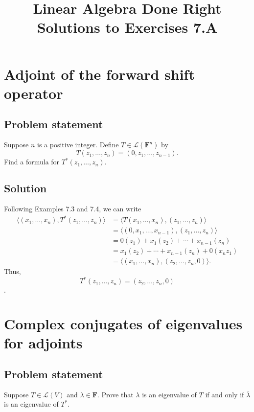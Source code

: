 \documentclass{article}
\title{Linear Algebra Done Right\\Solutions to Exercises 7.A}
\author{}
\date{}
\begin{document}
\maketitle

\section{Adjoint of the forward shift operator}
\subsection*{Problem statement}
Suppose $n$ is a positive integer. Define $T\in\mathcal{L}(\mathbf{F}^{n})$ by
\[T(z_1,\ldots,z_n)=(0,z_1,\ldots,z_{n-1}).\]
Find a formula for $T^*(z_1,\ldots,z_n)$.

\subsection*{Solution}
Following Examples 7.3 and 7.4, we can write
\begin{align*} 
\langle(x_1,\ldots,x_n),T^*(z_1,\ldots,z_n)\rangle &= \langle T(x_1,\ldots,x_n),(z_1,\ldots,z_n)\rangle \\ 
 &= \langle (0,x_1,\ldots,x_{n-1}),(z_1,\ldots,z_n)\rangle \\
 &= 0(z_1) + x_1(z_2) + \cdots + x_{n-1}(z_n) \\
 &= x_1(z_2) + \cdots + x_{n-1}(z_n) + 0(x_nz_1) \\
 &= \langle (x_1,\ldots,x_n),(z_2,\ldots,z_n,0)\rangle.
\end{align*}
Thus,
\[T^*(z_1,\ldots,z_n)=(z_2,\ldots,z_n,0)\].

\clearpage

\section{Complex conjugates of eigenvalues for adjoints}
\subsection*{Problem statement}
Suppose $T\in\mathcal{L}(V)$ and $\lambda\in\mathbf{F}$. Prove that $\lambda$ is an eigenvalue of $T$ if and only if $\bar{\lambda}$ is an eigenvalue of $T^*$.
\end{document}
